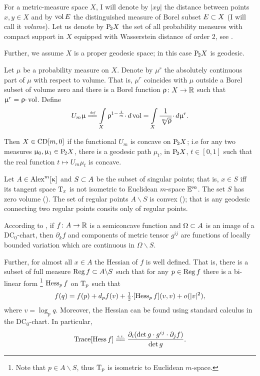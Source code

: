 \documentclass[oneside,a4paper]{article}
\begin{document}
For a metric-measure space $X$, 
I will denote 
by $|x y|$ the distance between points $x,y\in X$
and by $\mathop{\rm vol}\nolimits E$ the distinguished measure of Borel subset $E\subset X$ (I will call it \emph{volume}).
Let us denote by $\mathrm {P}_{\!2} X$ the set of all probability measures with compact support in $X$ equipped with Wasserstein distance of order 2, see \cite[6.1]{villani}.

Further, we assume $X$ is a proper geodesic space;
in this case $\mathrm {P}_{\!2} X$ is geodesic.

Let $\mu$ be a probability measure on $X$.
Denote by $\mu^{r}$ the absolutely continuous part of $\mu$ with respect to volume.
That is, 
$\mu^{r}$ coincides with $\mu$ outside a Borel subset of volume zero and
 there is a Borel function $\upvarrho\colon X\to\mathbb{R}$ such that $\upmu^{r}=\upvarrho{\cdot}\mathop{\rm vol}\nolimits$.
Define
$$U_m\mu
\df
\int\limits_X\rho^{1-\frac1m}{\cdot}\, d\vol
=
\int\limits_X\frac1{\sqrt[m]{\rho}}{\cdot}\,d\mu^r.$$

Then $X\in \CD m0$ if the functional $U_m$ is concave on  $\mathrm {P}_{\!2} X$;
i.e for any two measures $\upmu_0,\upmu_1\in \mathrm {P}_{\!2} X$,
there is a geodesic path $\mu_t$, in $\mathrm {P}_{\!2} X$, $t\in[0,1]$ such that the real function $t\mapsto U_m\mu_t$ is concave.



Let $A\in\CBB m\kappa$ and $S\subset A$ be the subset of singular points;
that is, $x\in S$ iff its tangent space $\text{\rm T}_x$ is not isometric to Euclidean $m$-space $\mathbb{E}^m$. 
The set $S$ has zero volume (\cite[10.6]{BGP}).
The set of regular points $A\backslash S$ is convex (\cite{petrunin:parallel}); 
that is any geodesic connecting two regular points consits only of regular points.

According to \cite{perelman:DC},  
if $f\colon A\to\mathbb{R}$ is a semiconcave function 
and $\Omega\subset A$ is an image of a $\mathrm{DC}_0$-chart,
then
$\partial_k f$ and components of metric tensor $g^{i j}$ are functions of locally bounded variation which are continuous in $\Omega\backslash S$.

Further, for almost all $x\in A$  the Hessian of $f$ is well defined.
That is, there is a subset of full measure $\mathop{\rm Reg}\nolimits f\subset A\backslash S$ such that for any $p\in \mathop{\rm Reg}\nolimits f$ there is a bi-linear form%
\footnote{Note that $p\in A\backslash S$, thus $\text{\rm T}_p$ is isometric to Euclidean $m$-space.}
 $\operatorname{Hess}_p f$ on $\text{\rm T}_p$ such that 
$$f(q)=f(p)+d_p f(v)+\tfrac12{\cdot}[\operatorname{Hess}_p f](v,v)+o(|v|^2),$$
where $v=\log_p q$.
Moreover, the Hessian can be found using standard calculus in the $\mathrm{DC}_0$-chart.
In particular,
$$\Trace[\Hess f]
\ae
\frac{\partial_i(\det g\cdot g^{i j}\cdot\partial_j f)}{\det g}.$$
\end{document}
